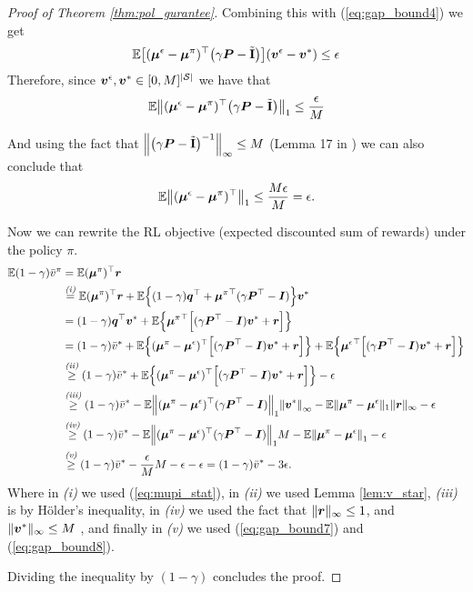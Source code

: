 \documentclass{article}
\DeclarePairedDelimiter\br{(}{)}%
\DeclarePairedDelimiter\brs{[}{]}%
\DeclarePairedDelimiter\brc{\{}{\}}%
\DeclarePairedDelimiter\abs{\lvert}{\rvert}%
\DeclarePairedDelimiter\norm{\lVert}{\rVert}%
\newcommand{\textrel}[2]{\stackrel{\textit{\text{#1}}}{#2} }
\newcommand{\E}{\mathbb{E}}
\newcommand{\States}{\mathcal{S}}
\newcommand{\nSt}{{\abs{\States}}}
\newcommand{\Pb}{\boldsymbol{P}}
\newcommand{\rb}{\boldsymbol{r}}
\newcommand{\vb}{\boldsymbol{v}}
\newcommand{\mub}{\boldsymbol{\mu}}
\newcommand{\vbar}{\bar{v}}
\newcommand{\vbe}{{\vb^\epsilon}}
\newcommand{\mube}{{\mub^\epsilon}}
\newcommand{\mubpi}{{\mub^\pi}}
\newcommand{\Ibt}{\tilde{\textbf{I}}}
\newcommand{\Ib}{\boldsymbol{I}}
\newcommand{\initDist}{\boldsymbol{q}}
\begin{document}
\begin{proof}[Proof of Theorem \ref{thm:pol_gurantee}]
 Combining this with (\ref{eq:gap_bound4}) we get
 \begin{equation} \label{eq:gap_bound6}
    \E \brs*{ ( \mube -\mubpi)^\top  \br*{\gamma \Pb - \Ibt}  } \br*{\vbe-\vb^*} \leq \epsilon 
\end{equation}
Therefore, since $\vbe, \vb^* \in [0,M]^\nSt$ we have that
 \begin{equation} \label{eq:gap_bound7}
    \E \norm*{ ( \mube -\mubpi)^\top  \br*{\gamma \Pb - \Ibt}  }_1  \leq \frac{\epsilon}{M}
\end{equation}

And using the fact that $\norm*{\br*{\gamma \Pb - \Ibt}^{-1}}_\infty \leq M$ (Lemma 17 in \citet{jin20efficiently}) we can also conclude that 
\begin{equation} \label{eq:gap_bound8}
    \E \norm*{ ( \mube -\mubpi)^\top  }_1  \leq \frac{M \epsilon}{M} = \epsilon.
\end{equation}




 
Now we can rewrite the RL objective (expected discounted sum of rewards) under the policy $\pi$.
\begin{align*}
     \E (1-\gamma) \vbar^\pi& =  \E (\mubpi)^\top \rb \\
    &\textrel{{(i)}}{=}   \E (\mubpi)^\top \rb + \E \brc*{(1-\gamma)\initDist^\top + \mubpi^\top \br{\gamma \Pb^\top  - \Ib} } \vb^*  \\
    & =   (1-\gamma)\initDist^\top  \vb^* + \E \brc*{ \mubpi^\top \brs*{\br{\gamma \Pb^\top  - \Ib} \vb^* +\rb}} \\
     & =  (1-\gamma) \vbar^* + \E \brc*{ (\mubpi - \mube)^\top \brs*{\br{\gamma \Pb^\top  - \Ib} \vb^* +\rb}}  +  \E \brc*{ \mube^\top \brs*{\br{\gamma \Pb^\top  - \Ib} \vb^* +\rb}} \\
    &\textrel{{(ii)}}{\geq}  (1-\gamma) \vbar^* + \E \brc*{ (\mubpi - \mube)^\top \brs*{\br{\gamma \Pb^\top  - \Ib} \vb^* +\rb}}  - \epsilon \\
    &\textrel{{(iii)}}{\geq}  (1-\gamma) \vbar^* - 
    \E \norm*{ (\mubpi - \mube)^\top \br{\gamma \Pb^\top  - \Ib}}_1 \norm*{\vb^*}_\infty -  \E \norm{\mubpi - \mube}_1 \norm{\rb}_\infty - \epsilon \\
      &\textrel{{(iv)}}{\geq}  (1-\gamma) \vbar^* - 
    \E \norm*{ (\mubpi - \mube)^\top \br{\gamma \Pb^\top  - \Ib}}_1 M-  \E \norm*{\mubpi - \mube}_1 - \epsilon\\
  &\textrel{{(v)}}{\geq}  (1-\gamma) \vbar^* - 
   \frac{\epsilon}{M} M-  \epsilon - \epsilon =  (1-\gamma) \vbar^* - 3 \epsilon.
\end{align*}
Where in \textit{(i)} we used (\ref{eq:mupi_stat}), in  \textit{(ii)} we used Lemma \ref{lem:v_star},  \textit{(iii)}  is by Hölder's inequality, in \textit{(iv)} we used the fact that $\norm{\rb}_\infty \leq 1$, and $\norm{\vb^*}_\infty \leq M$ , and finally in \textit{(v)}  we used  (\ref{eq:gap_bound7}) and  (\ref{eq:gap_bound8}).

Dividing the inequality by $(1-\gamma)$ concludes the proof.

\end{proof}





\end{document}
